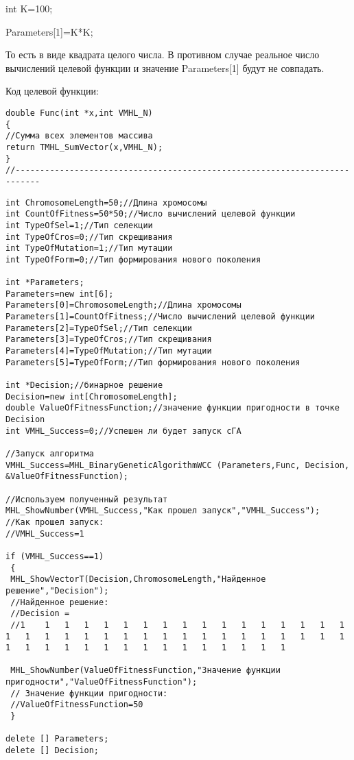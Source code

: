 \documentclass[a4paper,12pt]{article}
\begin{document}
int K=100;

Parameters[1]=K*K;

То есть в виде квадрата целого числа. В противном случае реальное число вычислений целевой функции и значение Parameters[1] будут не совпадать.

Код целевой функции:
\begin{lstlisting}[caption=Оптимизируемая функция]
double Func(int *x,int VMHL_N)
{
//Сумма всех элементов массива
return TMHL_SumVector(x,VMHL_N);
}
//---------------------------------------------------------------------------
\end{lstlisting}


\begin{lstlisting}[label=code_use_MHL_BinaryGeneticAlgorithmWCC,caption=Пример использования]
int ChromosomeLength=50;//Длина хромосомы
int CountOfFitness=50*50;//Число вычислений целевой функции
int TypeOfSel=1;//Тип селекции
int TypeOfCros=0;//Тип скрещивания
int TypeOfMutation=1;//Тип мутации
int TypeOfForm=0;//Тип формирования нового поколения

int *Parameters;
Parameters=new int[6];
Parameters[0]=ChromosomeLength;//Длина хромосомы
Parameters[1]=CountOfFitness;//Число вычислений целевой функции
Parameters[2]=TypeOfSel;//Тип селекции
Parameters[3]=TypeOfCros;//Тип скрещивания
Parameters[4]=TypeOfMutation;//Тип мутации
Parameters[5]=TypeOfForm;//Тип формирования нового поколения

int *Decision;//бинарное решение
Decision=new int[ChromosomeLength];
double ValueOfFitnessFunction;//значение функции пригодности в точке Decision
int VMHL_Success=0;//Успешен ли будет запуск cГА

//Запуск алгоритма
VMHL_Success=MHL_BinaryGeneticAlgorithmWCC (Parameters,Func, Decision, &ValueOfFitnessFunction);

//Используем полученный результат
MHL_ShowNumber(VMHL_Success,"Как прошел запуск","VMHL_Success");
//Как прошел запуск:
//VMHL_Success=1

if (VMHL_Success==1)
 {
 MHL_ShowVectorT(Decision,ChromosomeLength,"Найденное решение","Decision");
 //Найденное решение:
 //Decision =
 //1	1	1	1	1	1	1	1	1	1	1	1	1	1	1	1	1	1	1	1	1	1	1	1	1	1	1	1	1	1	1	1	1	1	1	1	1	1	1	1	1	1	1	1	1	1	1	1	1	1

 MHL_ShowNumber(ValueOfFitnessFunction,"Значение функции пригодности","ValueOfFitnessFunction");
 // Значение функции пригодности:
 //ValueOfFitnessFunction=50
 }

delete [] Parameters;
delete [] Decision;
\end{lstlisting}
\end{document}

